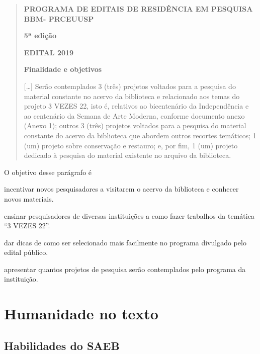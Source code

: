 \begin{quote}
\textbf{PROGRAMA DE EDITAIS DE RESIDÊNCIA EM PESQUISA BBM- PRCEUUSP}

\textbf{5ª edição}

\textbf{EDITAL 2019}

\textbf{Finalidade e objetivos}

{[}\ldots{}{]} Serão contemplados 3 (três) projetos voltados para a
pesquisa do material constante no acervo da biblioteca e relacionado aos
temas do projeto 3 VEZES 22, isto é, relativos ao bicentenário da
Independência e ao centenário da Semana de Arte Moderna, conforme
documento anexo (Anexo 1); outros 3 (três) projetos voltados para a
pesquisa do material constante do acervo da biblioteca que abordem
outros recortes temáticos; 1 (um) projeto sobre conservação e restauro;
e, por fim, 1 (um) projeto dedicado à pesquisa do material existente no
arquivo da biblioteca.

\end{quote}

\pagebreak
O objetivo desse parágrafo é

\begin{escolha}
\item incentivar novos pesquisadores a visitarem o acervo da biblioteca e
conhecer novos materiais.

\item ensinar pesquisadores de diversas instituições a como fazer
trabalhos da temática ``3 VEZES 22''.

\item dar dicas de como ser selecionado mais facilmente no programa
divulgado pelo edital público.

\item apresentar quantos projetos de pesquisa serão contemplados pelo
programa da instituição.
\end{escolha}


\chapter{Humanidade no texto}

\section{Habilidades do SAEB}

